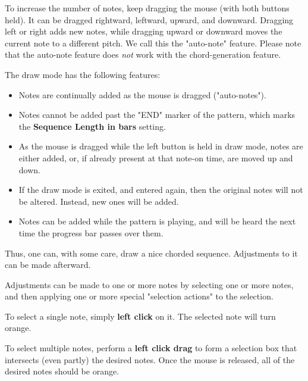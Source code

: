    To increase the number of notes, keep dragging the mouse (with
   both buttons held).  It can be dragged rightward, leftward, upward, and
   downward.
   Dragging left or right adds new notes, while dragging upward or
   downward moves the current note to a different pitch.
   We call this the "auto-note" feature.
   Please note that the auto-note feature does \textsl{not} work with
   the chord-generation feature.

   The draw mode has the following features:

   \begin{itemize}
      \item Notes are continually added as the mouse is dragged ("auto-notes").
      \item Notes cannot be added past the "END" marker of the pattern, which
         marks the \textbf{Sequence Length in bars} setting.
      \item As the mouse is dragged while the left button is held in draw mode,
         notes are either added, or, if already present at that note-on time,
         are moved up and down.
      \item If the draw mode is exited, and entered again, then the original
         notes will not be altered.  Instead, new ones will be added.
      \item Notes can be added while the pattern is playing, and will be heard
         the next time the progress bar passes over them.
   \end{itemize}

   Thus, one can, with some care, draw a nice chorded sequence.
   Adjustments to it can be made afterward.

   Adjustments can be made to one or more notes by selecting one or more notes,
   and then applying one or more special
    "selection actions" to the selection.

   To select a single note, simply \textbf{left click} on it.
   The selected note will turn orange.

   To select multiple notes, perform a \textbf{left click drag}
   to form a selection box that intersects (even partly) the desired notes.
   Once the mouse is released, all of the desired notes should be orange.

